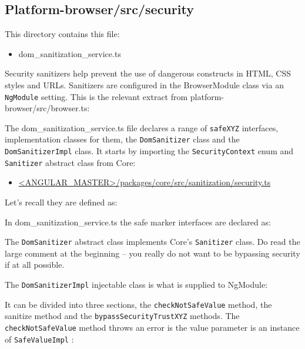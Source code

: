 \subsection{Platform-browser/src/security}

This directory contains this file:

\begin{itemize}
  \item dom\_sanitization\_service.ts
\end{itemize}

Security sanitizers help prevent the use of dangerous constructs in HTML, CSS styles
and URLs. Sanitizers are configured in the BrowserModule class via an
\texttt{NgModule}
setting. This is the relevant extract from platform-browser/src/browser.ts:



The dom\_sanitization\_service.ts file declares a range of
\texttt{safeXYZ}
interfaces,
implementation classes for them, the
\texttt{DomSanitizer}
class and the
\texttt{DomSanitizerImpl}
class. It starts by importing the
\texttt{SecurityContext}
enum and
\texttt{Sanitizer}
abstract class
from Core:

\begin{itemize}
  \item \href{https://github.com/angular/angular/blob/master/packages/core/src/sanitization/security.ts}
        {<ANGULAR\_MASTER>/packages/core/src/sanitization/security.ts}
\end{itemize}

Let’s recall they are defined as:



In dom\_sanitization\_service.ts the safe marker interfaces are declared as:



The
\texttt{DomSanitizer}
abstract class implements Core’s
\texttt{Sanitizer}
class. Do read the
large comment at the beginning – you really do not want to be bypassing security if at
all possible.



The
\texttt{DomSanitizerImpl}
injectable class is what is supplied to NgModule:



It can be divided into three sections, the
\texttt{checkNotSafeValue}
method, the sanitize
method and the
\texttt{bypassSecurityTrustXYZ}
methods. The
\texttt{checkNotSafeValue}
method
throws an error is the value parameter is an instance of
\texttt{SafeValueImpl}
:

